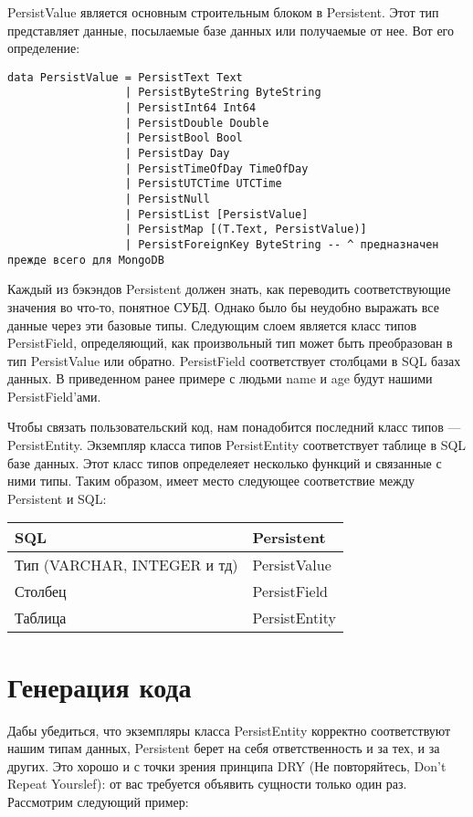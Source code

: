 PersistValue является основным строительным блоком в Persistent. Этот тип представляет данные, посылаемые базе данных или получаемые от нее. Вот его определение:

\begin{lstlisting}
data PersistValue = PersistText Text
                  | PersistByteString ByteString
                  | PersistInt64 Int64
                  | PersistDouble Double
                  | PersistBool Bool
                  | PersistDay Day
                  | PersistTimeOfDay TimeOfDay
                  | PersistUTCTime UTCTime
                  | PersistNull
                  | PersistList [PersistValue]
                  | PersistMap [(T.Text, PersistValue)]
                  | PersistForeignKey ByteString -- ^ предназначен прежде всего для MongoDB
\end{lstlisting}

Каждый из бэкэндов Persistent должен знать, как переводить соответствующие значения во что-то, понятное СУБД. Однако было бы неудобно выражать все данные через эти базовые типы. Следующим слоем является класс типов PersistField, определяющий, как произвольный тип может быть преобразован в тип PersistValue или обратно. PersistField соответствует столбцами в SQL базах данных. В приведенном ранее примере с людьми name и age будут нашими PersistField'ами.

Чтобы связать пользовательский код, нам понадобится последний класс типов --- PersistEntity. Экземпляр класса типов PersistEntity соответствует таблице в SQL базе данных. Этот класс типов определеяет несколько функций и связанные с ними типы. Таким образом, имеет место следующее соответствие между Persistent и SQL:

\begin{center}
\begin{tabular}{ | l | l |}
\hline
SQL	& Persistent \\ \hline
Тип (VARCHAR, INTEGER и тд)	& PersistValue \\ \hline
Столбец & PersistField \\ \hline
Таблица	& PersistEntity \\ \hline
\end{tabular}
\end{center}

\section{Генерация кода} %

Дабы убедиться, что экземпляры класса PersistEntity корректно соответствуют нашим типам данных, Persistent берет на себя ответственность и за тех, и за других. Это хорошо и с точки зрения принципа DRY (Не повторяйтесь, Don't Repeat Yourslef): от вас требуется объявить сущности только один раз. Рассмотрим следующий пример:

